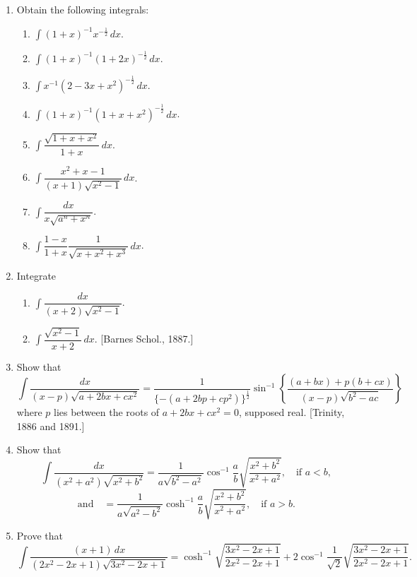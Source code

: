 \documentclass[11pt, a4paper]{article}
\newcommand{\source}[1]{\hfill\textnormal{[#1]}}
\begin{document}
\begin{enumerate}[leftmargin=2em]

\item Obtain the following integrals:
\begin{enumerate}[label=(\roman*)]
\item $\displaystyle\int (1+x)^{-1}x^{-\frac12}\,dx$.
\item $\displaystyle\int (1+x)^{-1}(1+2x)^{-\frac12}\,dx$.
\item $\displaystyle\int x^{-1}(2-3x+x^2)^{-\frac12}\,dx$.
\item $\displaystyle\int (1+x)^{-1}(1+x+x^2)^{-\frac12}\,dx$.
\item $\displaystyle\int \dfrac{\sqrt{1+x+x^2}}{1+x}\,dx$.
\item $\displaystyle\int \dfrac{x^2+x-1}{(x+1)\sqrt{x^2-1}}\,dx$.
\item $\displaystyle\int \dfrac{dx}{x\sqrt{a^n+x^n}}$.
\item $\displaystyle\int \dfrac{1-x}{1+x}\dfrac{1}{\sqrt{x+x^2+x^3}}\,dx$.
\end{enumerate}

\item Integrate
\begin{enumerate}[label=(\roman*)]
\item $\displaystyle\int \dfrac{dx}{(x+2)\sqrt{x^2-1}}$.
\item $\displaystyle\int \dfrac{\sqrt{x^2-1}}{x+2}\,dx$. \source{Barnes Schol., 1887.}
\end{enumerate}

\item Show that
\[
\int \dfrac{dx}{(x-p)\sqrt{a+2bx+cx^2}}=\dfrac{1}{\{-(a+2bp+cp^2)\}^{\frac12}}\sin^{-1}\left\{\dfrac{(a+bx)+p(b+cx)}{(x-p)\sqrt{b^2-ac}}\right\}
\]
where $p$ lies between the roots of $a+2bx+cx^2=0$, supposed real. \source{Trinity, 1886 and 1891.}

\item Show that
\[
\int \dfrac{dx}{(x^2+a^2)\sqrt{x^2+b^2}}=\dfrac{1}{a\sqrt{b^2-a^2}}\cos^{-1}\dfrac{a}{b}\sqrt{\dfrac{x^2+b^2}{x^2+a^2}}, \quad \text{if } a<b,
\]
\[
\text{and} \quad =\dfrac{1}{a\sqrt{a^2-b^2}}\cosh^{-1}\dfrac{a}{b}\sqrt{\dfrac{x^2+b^2}{x^2+a^2}}, \quad \text{if } a>b.
\]

\item Prove that
\[
\int \dfrac{(x+1)\,dx}{(2x^2-2x+1)\sqrt{3x^2-2x+1}}=\cosh^{-1}\sqrt{\dfrac{3x^2-2x+1}{2x^2-2x+1}}
+2\cos^{-1}\dfrac{1}{\sqrt2}\sqrt{\dfrac{3x^2-2x+1}{2x^2-2x+1}}.
\]


\end{enumerate}
\end{document}
